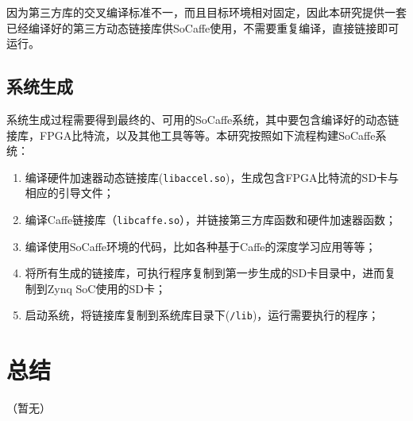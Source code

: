 因为第三方库的交叉编译标准不一，而且目标环境相对固定，因此本研究提供一套已经编译好的第三方动态链接库供SoCaffe使用，不需要重复编译，直接链接即可运行。

\subsection{系统生成}

系统生成过程需要得到最终的、可用的SoCaffe系统，其中要包含编译好的动态链接库，FPGA比特流，以及其他工具等等。本研究按照如下流程构建SoCaffe系统：

\begin{enumerate}
\item 编译硬件加速器动态链接库(\texttt{libaccel.so})，生成包含FPGA比特流的SD卡与相应的引导文件；
\item 编译Caffe链接库（\texttt{libcaffe.so}），并链接第三方库函数和硬件加速器函数；
\item 编译使用SoCaffe环境的代码，比如各种基于Caffe的深度学习应用等等；
\item 将所有生成的链接库，可执行程序复制到第一步生成的SD卡目录中，进而复制到Zynq SoC使用的SD卡；
\item 启动系统，将链接库复制到系统库目录下(\texttt{/lib})，运行需要执行的程序；
\end{enumerate}

\section{总结}

（暂无）